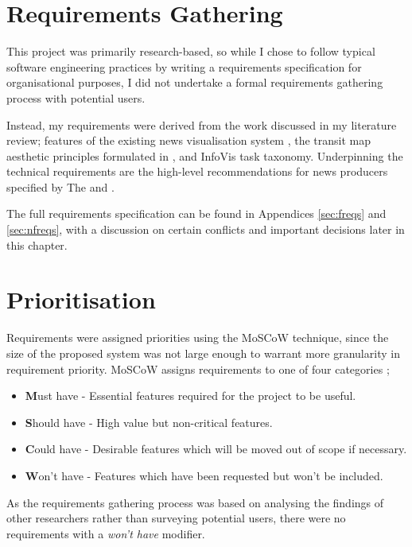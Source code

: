 \section{Requirements Gathering}
This project was primarily research-based, so while I chose to follow typical software engineering practices by writing a requirements specification for organisational purposes, I did not undertake a formal requirements gathering process with potential users.

Instead, my requirements were derived from the work discussed in my literature review; features of the existing news visualisation system \citep{GeneratingInformationMaps}, the transit map aesthetic principles formulated in \citep{AutomaticMetroMapLayoutThesis, AutomaticMetroMapLayout}, and  InfoVis task taxonomy. Underpinning the technical requirements are the high-level recommendations for news producers specified by The \cite{anewmodelfornews} and \cite{overloadjournalismsbattle}.

The full requirements specification can be found in Appendices \ref{sec:freqs} and \ref{sec:nfreqs}, with a discussion on certain conflicts and important decisions later in this chapter.

\section{Prioritisation}
Requirements were assigned priorities using the MoSCoW technique, since the size of the proposed system was not large enough to warrant more granularity in requirement priority. MoSCoW assigns requirements to one of four categories \citep{PrioritizationUsingMoscow};
\begin{itemize}[noitemsep]
	\item\textbf{M}ust have - Essential features required for the project to be useful.
	\item\textbf{S}hould have - High value but non-critical features.
	\item\textbf{C}ould have - Desirable features which will be moved out of scope if necessary.
	\item\textbf{W}on't have - Features which have been requested but won't be included. 
\end{itemize}
As the requirements gathering process was based on analysing the findings of other researchers rather than surveying potential users, there were no requirements with a \textit{won't have} modifier.

